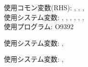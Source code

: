 \begin{hosoku}\small
使用コモン変数(RHS): , , , \\
使用システム変数: , , , , , , \\
使用プログラム: O9392
\end{hosoku}

\begin{hosoku}\small
使用システム変数: , 
\end{hosoku}

\begin{hosoku}\small
使用システム変数: , 
\end{hosoku}

